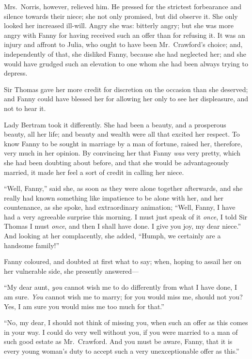 Mrs.\ Norris, however, relieved him.  He pressed
for the strictest forbearance and silence towards
their niece; she not only promised, but did observe it.
She only looked her increased ill-will. Angry she was:
bitterly angry; but she was more angry with Fanny for
having received such an offer than for refusing it.
It was an injury and affront to Julia, who ought to have
been Mr.\ Crawford's choice; and, independently of that,
she disliked Fanny, because she had neglected her;
and she would have grudged such an elevation to one whom
she had been always trying to depress.

Sir Thomas gave her more credit for discretion on the
occasion than she deserved; and Fanny could have blessed
her for allowing her only to see her displeasure,
and not to hear it.

Lady Bertram took it differently.  She had been a beauty,
and a prosperous beauty, all her life; and beauty
and wealth were all that excited her respect.  To know
Fanny to be sought in marriage by a man of fortune,
raised her, therefore, very much in her opinion.
By convincing her that Fanny \emph{was} very pretty, which she
had been doubting about before, and that she would be
advantageously married, it made her feel a sort of credit
in calling her niece.

``Well, Fanny,'' said she, as soon as they were alone
together afterwards, and she really had known something
like impatience to be alone with her, and her countenance,
as she spoke, had extraordinary animation; ``Well, Fanny,
I have had a very agreeable surprise this morning.  I must
just speak of it \emph{once}, I told Sir Thomas I must \emph{once},
and then I shall have done.  I give you joy, my dear niece.''
And looking at her complacently, she added, ``Humph, we
certainly are a handsome family!''

Fanny coloured, and doubted at first what to say;
when, hoping to assail her on her vulnerable side,
she presently answered---%

``My dear aunt, \emph{you} cannot wish me to do differently from
what I have done, I am sure.  \emph{You} cannot wish me to marry;
for you would miss me, should not you?  Yes, I am sure
you would miss me too much for that.''

``No, my dear, I should not think of missing you,
when such an offer as this comes in your way.
I could do very well without you, if you were married
to a man of such good estate as Mr.\ Crawford.  And you
must be aware, Fanny, that it is every young woman's
duty to accept such a very unexceptionable offer as this.''

